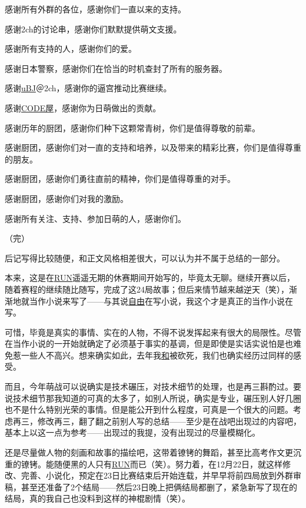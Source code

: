 感谢所有外群的各位，感谢你们一直以来的支持。

感谢2ch的讨论串，感谢你们默默提供萌文支援。

感谢所有支持的人，感谢你们的爱。

感谢日本警察，感谢你们在恰当的时机查封了所有的服务器。

感谢\uline{uBJ}＠2ch，感谢你的逼宫推动比赛继续。

感谢\uline{CODE屋}，感谢你为日萌做出的贡献。

感谢历年的厨团，感谢你们种下这颗常青树，你们是值得尊敬的前辈。

感谢厨团，感谢你们对一直的支持和培养，以及带来的精彩比赛，你们是值得尊重的朋友。

感谢厨团，感谢你们勇往直前的精神，你们是值得尊重的对手。

感谢厨团，感谢你们对我的激励。

感谢所有关注、支持、参加日萌的人，感谢你们。

（完）


后记写得比较随便，和正文风格相差很大，可以认为并不属于总结的一部分。

本来，这是在\uline{RUN}遥遥无期的休赛期间开始写的，毕竟太无聊。继续开赛以后，随着赛程的继续随比随写，完成了这24局故事；但后来情节越来越逆天（笑），渐渐地就当作小说来写了——与其说\uline{自由}在写小说，我这个才是真正的当作小说在写。

可惜，毕竟是真实的事情、实在的人物，不得不说发挥起来有很大的局限性。尽管在当作小说的一开始就确定了必须基于事实的基调，但是即使是实话实说怕是也难免惹一些人不高兴。想来确实如此，去年我\uline{和}被砍死，我们也确实经历过同样的感受。

而且，今年萌战可以说确实是技术碾压，对技术细节的处理，也是再三斟酌过。要说技术细节那我知道的可真的太多了，如别人所说，确实是专业，碾压别人好几圈也不是什么特别光荣的事情。但是能公开到什么程度，可真是一个很大的问题。考虑再三，修改再三，翻了翻之前别人写的总结——至少是在战吧出现过的内容吧，基本上以这一点为参考——出现过的我提，没有出现过的尽量模糊化。

还是尽量做人物的刻画和故事的描绘吧，这带着镣铐的舞蹈，甚至比高考作文更沉重的镣铐。能随便黑的人只有\uline{RUN}而已（笑）。努力着，在12月22日，就这样修改、完善、小说化，预定在23日比赛结束后开始连载，并早早将前四局放到外群审稿，甚至还准备了2个结局——然后23日晚上把俩结局都删了，紧急新写了现在的结局，真的我自己也没料到这样的神棍剧情（笑）。

